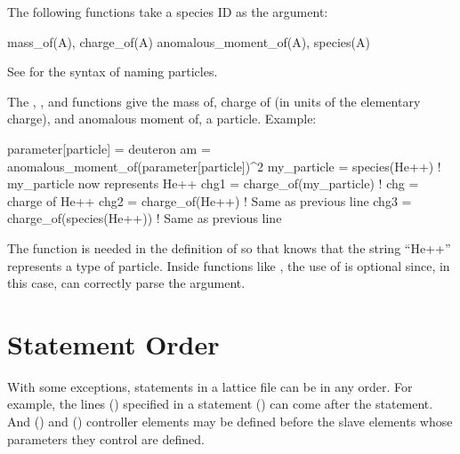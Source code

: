 {{{{{The following functions take a species ID as the argument:
\begin{example}
  mass_of(A),              charge_of(A)
  anomalous_moment_of(A),  species(A)
\end{example}
See  for the syntax of naming particles.

The , , and  functions give the mass of, charge of
(in units of the elementary charge), and anomalous moment of, a particle.  Example:
\begin{example}
  parameter[particle] = deuteron
  am = anomalous_moment_of(parameter[particle])^2
  my_particle = species(He++)      ! my_particle now represents He++
  chg1 = charge_of(my_particle)    ! chg = charge of He++
  chg2 = charge_of(He++)           ! Same as previous line
  chg3 = charge_of(species(He++))  ! Same as previous line
\end{example}
The  function is needed in the definition of  so that \bmad knows that
the string ``He++'' represents a type of particle. Inside functions like , the use of
 is optional since, in this case, \bmad can correctly parse the argument.

\section{Statement Order}
\label{s:state.order}

With some exceptions, statements in a lattice file can be in any order. For example, the lines
() specified in a  statement () can come after the 
statement. And  () and  () controller elements
may be defined before the slave elements whose parameters they control are defined.

}}}}}
